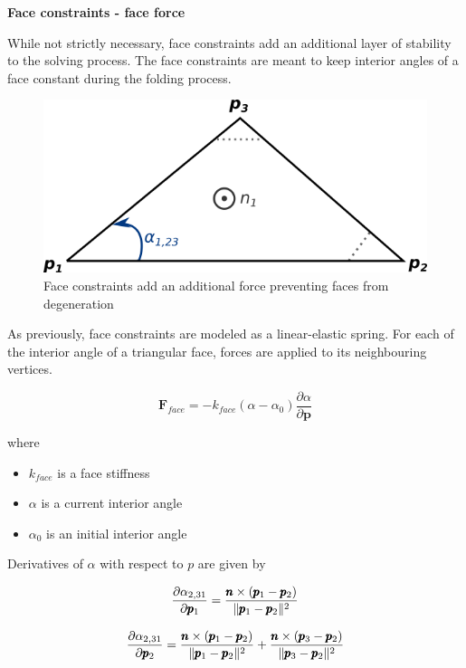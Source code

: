 \medskip
\textbf{Face constraints - face force}
\smallskip

While not strictly necessary, face constraints add an additional layer of stability to the 
solving process. The face constraints are meant to keep interior angles of a face
constant during the folding process.

\begin{figure}[H]
	\caption{Face constraints add an additional force preventing faces from degeneration}
    \centering
	\includegraphics[width=.6\linewidth]{assets/3-face_force_face.png}
\end{figure}

As previously, face constraints are modeled as a linear-elastic spring.
For each of the interior angle of a triangular face, forces are applied to its neighbouring vertices.

\begin{equation} \label{solver:face_force}
	\pmb{F}_{face} = -k_{face}(\alpha - \alpha _0)\frac{\partial \alpha}{\partial \pmb{p}}
\end{equation}

where

\begin{itemize}
	\item $k_{face}$ is a face stiffness
	\item $\alpha$ is a current interior angle
	\item $\alpha _0$ is an initial interior angle
\end{itemize}

Derivatives of $\alpha$ with respect to $p$ are given by

\begin{equation} \label{solver:face_force1}
	\frac{\partial \alpha _{2,31}}{\partial \pmb{p}_1} = \frac{\pmb{n} \times (\pmb{p}_1 - \pmb{p}_2)}{\|\pmb{p}_1 - \pmb{p}_2\|^2}
\end{equation}

\begin{equation} \label{solver:face_force2}
	\frac{\partial \alpha _{2,31}}{\partial \pmb{p}_2} = \frac{\pmb{n} \times (\pmb{p}_1 - \pmb{p}_2)}{\|\pmb{p}_1 - \pmb{p}_2\|^2} + \frac{\pmb{n} \times (\pmb{p}_3 - \pmb{p}_2)}{\|\pmb{p}_3 - \pmb{p}_2\|^2}
\end{equation}

